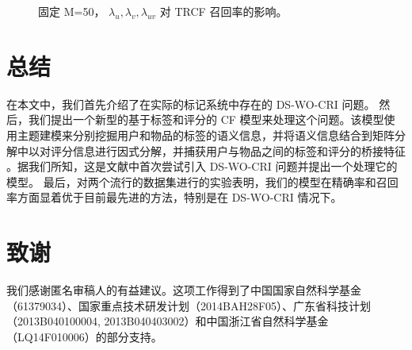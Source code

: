 \begin{figure}
\centering
{}
\caption{固定 M=50， $\lambda_u, \lambda_v, \lambda_{uv}$ 对 TRCF 召回率的影响。}
\end{figure}



\chapter{总结}
在本文中，我们首先介绍了在实际的标记系统中存在的 DS-WO-CRI 问题。 然后，我们提出一个新型的基于标签和评分的 CF 模型来处理这个问题。该模型使用主题建模来分别挖掘用户和物品的标签的语义信息，并将语义信息结合到矩阵分解中以对评分信息进行因式分解，并捕获用户与物品之间的标签和评分的桥接特征 。据我们所知，这是文献中首次尝试引入 DS-WO-CRI 问题并提出一个处理它的模型。 最后，对两个流行的数据集进行的实验表明，我们的模型在精确率和召回率方面显着优于目前最先进的方法，特别是在 DS-WO-CRI 情况下。

\chapter{致谢}
我们感谢匿名审稿人的有益建议。这项工作得到了中国国家自然科学基金（61379034）、国家重点技术研发计划（2014BAH28F05）、广东省科技计划（2013B040100004, 2013B040403002）和中国浙江省自然科学基金（LQ14F010006）的部分支持。









